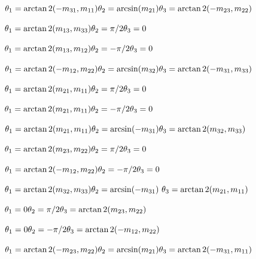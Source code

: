 \documentclass{article}
\begin{document}
$ \theta_1 = \arctan2(-m_{31},m_{11})\\\theta_2 = \arcsin(m_{21}) \\\theta_3= \arctan2(-m_{23},m_{22}) $
\pagebreak

$ \theta_1=\arctan2(m_{13},m_{33})\\ \theta_2=\pi/2\\ \theta_3=0 $
\pagebreak

$ \theta_1=\arctan2(m_{13},m_{12})\\ \theta_2=-\pi/2\\ \theta_3=0 $
\pagebreak

$ \theta_1 = \arctan2(-m_{12},m_{22})\\\theta_2 = \arcsin(m_{32}) \\\theta_3= \arctan2(-m_{31},m_{33}) $
\pagebreak

$ \theta_1=\arctan2(m_{21},m_{11})\\ \theta_2=\pi/2\\ \theta_3=0 $
\pagebreak

$ \theta_1=\arctan2(m_{21},m_{11})\\ \theta_2=-\pi/2\\ \theta_3=0 $
\pagebreak

$ \theta_1 = \arctan2(m_{21},m_{11})\\\theta_2 = \arcsin(-m_{31}) \\\theta_3= \arctan2(m_{32},m_{33}) $
\pagebreak

$ \theta_1=\arctan2(m_{23},m_{22})\\ \theta_2=\pi/2\\ \theta_3=0 $
\pagebreak

$ \theta_1=\arctan2(-m_{12},m_{22})\\ \theta_2=-\pi/2\\ \theta_3=0 $
\pagebreak

$ \theta_1 = \arctan2(m_{32},m_{33})\\\theta_2 = \arcsin(-m_{31}) \\\ \theta_3 = \arctan2(m_{21},m_{11})$
\pagebreak

$ \theta_1= 0\\ \theta_2=\pi/2\\ \theta_3=\arctan2(m_{23},m_{22}) $
\pagebreak

$ \theta_1=0\\ \theta_2=-\pi/2\\ \theta_3=\arctan2(-m_{12},m_{22}) $
\pagebreak

$ \theta_1 = \arctan2(-m_{23},m_{22})\\\theta_2 = \arcsin(m_{21}) \\\theta_3=  \arctan2(-m_{31},m_{11})$
\pagebreak
\end{document}
